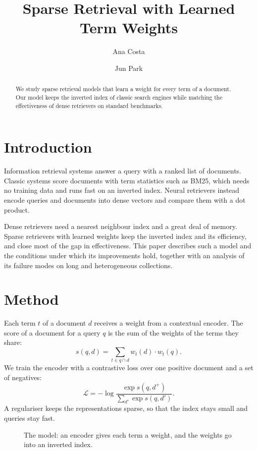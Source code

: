 \documentclass[10pt,twocolumn]{article}
\title{Sparse Retrieval with Learned Term Weights}
\author{Ana Costa \and Jun Park}
\date{}
\begin{document}
\maketitle
\begin{abstract}
We study sparse retrieval models that learn a weight for every term of a document. Our model keeps the inverted index of classic search engines while matching the effectiveness of dense retrievers on standard benchmarks.
\end{abstract}

\section{Introduction}
Information retrieval systems answer a query with a ranked list of documents. Classic systems score documents with term statistics such as BM25, which needs no training data and runs fast on an inverted index. Neural retrievers instead encode queries and documents into dense vectors and compare them with a dot product.

Dense retrievers need a nearest neighbour index and a great deal of memory. Sparse retrievers with learned weights keep the inverted index and its efficiency, and close most of the gap in effectiveness. This paper describes such a model and the conditions under which its improvements hold, together with an analysis of its failure modes on long and heterogeneous collections.

\section{Method}
Each term $t$ of a document $d$ receives a weight from a contextual encoder. The score of a document for a query $q$ is the sum of the weights of the terms they share:
\begin{equation}
s(q, d) = \sum_{t \in q \cap d} w_t(d) \cdot w_t(q).
\end{equation}
We train the encoder with a contrastive loss over one positive document and a set of negatives:
\begin{equation}
\mathcal{L} = -\log \frac{\exp s(q, d^+)}{\sum_{d'} \exp s(q, d')}.
\end{equation}
A regulariser keeps the representations sparse, so that the index stays small and queries stay fast.

\begin{figure}[h]
\centering
{}
\caption{The model: an encoder gives each term a weight, and the weights go into an inverted index.}
\end{figure}
\end{document}
